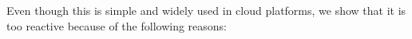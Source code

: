 


Even though this is simple and widely used in cloud platforms, we show
that it is too reactive because of the following reasons:



